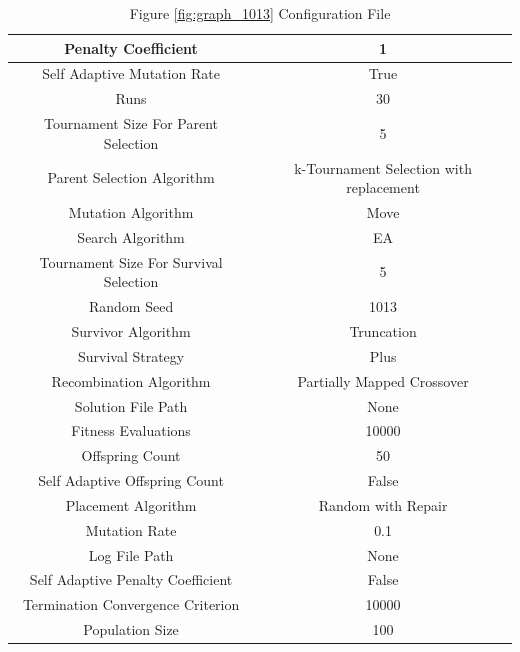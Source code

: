 \documentclass{standalone}
\begin{document}
\begin{table}[!htb]
	\centering
	\caption{Figure \ref{fig:graph_1013} Configuration File}
	\label{tab:graph_1013}
	\begin{tabular}{| c | c |}
		\hline
		Penalty Coefficient		& 1		 \\
		\hline
		Self Adaptive Mutation Rate		& True		 \\
		\hline
		Runs		& 30		 \\
		\hline
		Tournament Size For Parent Selection		& 5		 \\
		\hline
		Parent Selection Algorithm		& k-Tournament Selection with replacement		 \\
		\hline
		Mutation Algorithm		& Move		 \\
		\hline
		Search Algorithm		& EA		 \\
		\hline
		Tournament Size For Survival Selection		& 5		 \\
		\hline
		Random Seed		& 1013		 \\
		\hline
		Survivor Algorithm		& Truncation		 \\
		\hline
		Survival Strategy		& Plus		 \\
		\hline
		Recombination Algorithm		& Partially Mapped Crossover		 \\
		\hline
		Solution File Path		& None		 \\
		\hline
		Fitness Evaluations		& 10000		 \\
		\hline
		Offspring Count		& 50		 \\
		\hline
		Self Adaptive Offspring Count		& False		 \\
		\hline
		Placement Algorithm		& Random with Repair		 \\
		\hline
		Mutation Rate		& 0.1		 \\
		\hline
		Log File Path		& None		 \\
		\hline
		Self Adaptive Penalty Coefficient		& False		 \\
		\hline
		Termination Convergence Criterion		& 10000		 \\
		\hline
		Population Size		& 100		 \\
		\hline
	\end{tabular}
\end{table}
\end{document}
